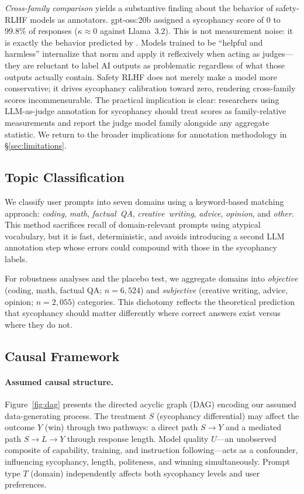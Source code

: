 \documentclass[11pt,twocolumn,a4paper]{article}
\begin{document}
\textit{Cross-family comparison} yields a substantive finding about
the behavior of safety-RLHF models as annotators. gpt-oss:20b assigned
a sycophancy score of 0 to 99.8\% of responses ($\kappa \approx 0$
against Llama~3.2). This is not measurement noise: it is exactly the
behavior predicted by \citet{bai2022training}. Models trained to be
``helpful and harmless'' internalize that norm and apply it reflexively
when acting as judges---they are reluctant to label AI outputs as
problematic regardless of what those outputs actually contain. Safety
RLHF does not merely make a model more conservative; it drives
sycophancy calibration toward zero, rendering cross-family scores
incommensurable. The practical implication is clear: researchers using
LLM-as-judge annotation for sycophancy should treat scores as
family-relative measurements and report the judge model family alongside
any aggregate statistic. We return to the broader implications for
annotation methodology in \S\ref{sec:limitations}.

\subsection{Topic Classification}
\label{sec:topics}

We classify user prompts into seven domains using a keyword-based
matching approach: \textit{coding}, \textit{math}, \textit{factual~QA},
\textit{creative~writing}, \textit{advice}, \textit{opinion}, and
\textit{other}. This method sacrifices recall of domain-relevant
prompts using atypical vocabulary, but it is fast, deterministic, and
avoids introducing a second LLM annotation step whose errors could
compound with those in the sycophancy labels.

For robustness analyses and the placebo test, we aggregate domains
into \textit{objective} (coding, math, factual QA; $n = 6{,}524$)
and \textit{subjective} (creative writing, advice, opinion; $n =
2{,}055$) categories. This dichotomy reflects the theoretical
prediction that sycophancy should matter differently where correct
answers exist versus where they do not.

\subsection{Causal Framework}
\label{sec:causal}

\paragraph{Assumed causal structure.} Figure~\ref{fig:dag} presents
the directed acyclic graph (DAG) encoding our assumed data-generating
process. The treatment $S$ (sycophancy differential) may affect the
outcome $Y$ (win) through two pathways: a direct path $S \to Y$ and a
mediated path $S \to L \to Y$ through response length. Model quality
$U$---an unobserved composite of capability, training, and instruction
following---acts as a confounder, influencing sycophancy, length,
politeness, and winning simultaneously. Prompt type $T$ (domain)
independently affects both sycophancy levels and user preferences.
\end{document}
